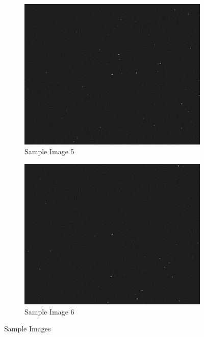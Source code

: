 \begin{figure}[h!]
\begin{subfigure}[b]{0.45\textwidth}
         \label{fig:sample_4}
    \end{subfigure}
    \\
    \begin{subfigure}[b]{0.45\textwidth}
        \centering
        \includegraphics[width=\textwidth]{Figures/Model/Sample Images/Image_5.png}
        \caption{Sample Image 5}
        \label{fig:sample_5}
    \end{subfigure}
    \hfill
    \begin{subfigure}[b]{0.45\textwidth}
         \centering
         \includegraphics[width=\textwidth]{Figures/Model/Sample Images/Image_6.png}
         \caption{Sample Image 6}
         \label{fig:sample_6}
    \end{subfigure}
    \caption{Sample Images}
    \label{fig:sample_images}
\end{figure}